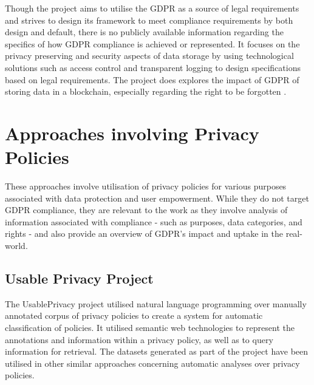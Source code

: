Though the project aims to utilise the GDPR as a source of legal requirements and strives to design its framework to meet compliance requirements by both design and default, there is no publicly available information regarding the specifics of how GDPR compliance is achieved or represented.
It focuses on the privacy preserving and security aspects of data storage by using technological solutions such as access control and transparent logging to design specifications based on legal requirements.
The project does explores the impact of GDPR of storing data in a blockchain, especially regarding the right to be forgotten \cite{bayle_when_2018}.

\section{Approaches involving Privacy Policies}\label{sec:sota:privacy-policies}
These approaches involve utilisation of privacy policies for various purposes associated with data protection and user empowerment. While they do not target GDPR compliance, they are relevant to the work as they involve analysis of information associated with compliance - such as purposes, data categories, and rights - and also provide an overview of GDPR's impact and uptake in the real-world.

\subsection*{Usable Privacy Project}
The UsablePrivacy project \cite{sadeh_usable_2013} utilised natural language programming over manually annotated corpus of privacy policies to create a system for automatic classification of policies. 
It utilised semantic web technologies \cite{oltramari_privonto_2018} to represent the annotations and information within a privacy policy, as well as to query information for retrieval.
The datasets generated as part of the project have been utilised in other similar approaches \cite{harkous_polisis_2018,linden_privacy_2018} concerning automatic analyses over privacy policies. 

